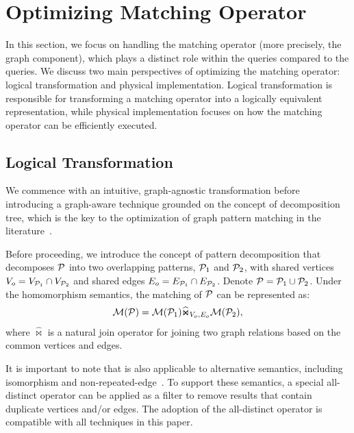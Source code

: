 \section{Optimizing Matching Operator}
\label{sec:optimizing-matching-operator}
In this section, we focus on handling the matching operator (more precisely, the graph component),
which plays a distinct role within the \spjm queries compared to the \spj queries. We discuss two main perspectives of optimizing
the matching operator: logical transformation and physical implementation. Logical transformation is
responsible for transforming a matching operator into a logically equivalent representation,
while physical implementation focuses on how the matching operator can be efficiently executed.


\subsection{Logical Transformation}
\label{sec:handling-match-operator}
We commence with an intuitive, graph-agnostic transformation before
introducing a graph-aware technique grounded on the concept of decomposition tree, which
is the key to the optimization of graph pattern matching in the literature~\cite{huge,GLogS}.

Before proceeding, we introduce the concept of pattern decomposition that decomposes $\mathcal{P}$ into two overlapping patterns, $\mathcal{P}_1$ and $\mathcal{P}_2$, with shared vertices $V_{o} = V_{\mathcal{P}_1} \cap V_{\mathcal{P}_2}$ and shared edges $E_{o} = E_{\mathcal{P}_1} \cap E_{\mathcal{P}_2}$.
Denote $\mathcal{P} = \mathcal{P}_1 \cup \mathcal{P}_2$. Under the homomorphism semantics, the matching of $\mathcal{P}$ can be represented as:
\begin{equation}
    \label{eq:join-pattern}
    \mathcal{M}(\mathcal{P}) = \mathcal{M}(\mathcal{P}_1) \widehat{\Join}_{V_{o}, E_{o}} \mathcal{M}(\mathcal{P}_2),
\end{equation}
where $\widehat{\Join}$ is a natural join operator for joining two graph relations based on the common vertices and edges.

It is important to note that  is also applicable to alternative semantics, including isomorphism and non-repeated-edge~\cite{angles2017foundations}. To support these semantics, a special all-distinct operator can be applied as a filter to remove results that contain duplicate vertices and/or edges. The adoption of the all-distinct operator is compatible with all techniques in this paper.

